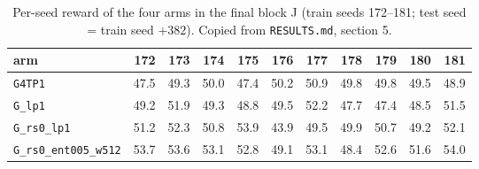 \begin{table}[h]\centering\small
\caption{Per-seed reward of the four arms in the final block J (train seeds 172--181; test seed = train seed $+382$). Copied from \texttt{RESULTS.md}, section 5.}\label{tab:perseed}
\begin{tabular}{@{}lrrrrrrrrrr@{}}\toprule
arm & 172 & 173 & 174 & 175 & 176 & 177 & 178 & 179 & 180 & 181\\\midrule
\texttt{\scriptsize G4TP1} & 47.5 & 49.3 & 50.0 & 47.4 & 50.2 & 50.9 & 49.8 & 49.8 & 49.5 & 48.9\\
\texttt{\scriptsize G\_lp1} & 49.2 & 51.9 & 49.3 & 48.8 & 49.5 & 52.2 & 47.7 & 47.4 & 48.5 & 51.5\\
\texttt{\scriptsize G\_rs0\_lp1} & 51.2 & 52.3 & 50.8 & 53.9 & 43.9 & 49.5 & 49.9 & 50.7 & 49.2 & 52.1\\
\texttt{\scriptsize G\_rs0\_ent005\_w512} & 53.7 & 53.6 & 53.1 & 52.8 & 49.1 & 53.1 & 48.4 & 52.6 & 51.6 & 54.0\\
\bottomrule\end{tabular}\end{table}
